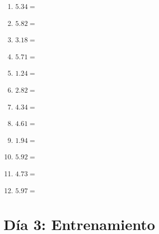 \documentclass[12pt]{article}
\begin{document}
\begin{enumerate}
\item \large $ 5.34 = $ \vspace{1.5cm}
\item \large $ 5.82 = $ \vspace{1.5cm}
\newpage
\item \large $ 3.18 = $ \vspace{1.5cm}
\item \large $ 5.71 = $ \vspace{1.5cm}
\item \large $ 1.24 = $ \vspace{1.5cm}
\item \large $ 2.82 = $ \vspace{1.5cm}
\item \large $ 4.34 = $ \vspace{1.5cm}
\item \large $ 4.61 = $ \vspace{1.5cm}
\item \large $ 1.94 = $ \vspace{1.5cm}
\item \large $ 5.92 = $ \vspace{1.5cm}
\item \large $ 4.73 = $ \vspace{1.5cm}
\item \large $ 5.97 = $ \vspace{1.5cm}
\end{enumerate}\newpage
\section*{Día 3: Entrenamiento}
\end{document}
